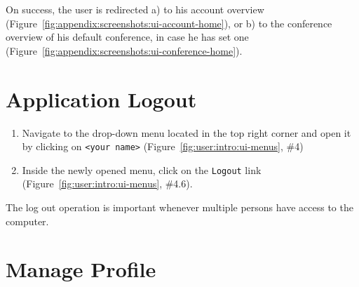 \documentclass[nochapterpage,nopartpage,noheadingspace,numbersubsubsec,bigchapter,colorback,accentcolor=tud9c,10pt]{tudreport}
\begin{document}
    \noindent
    On success, the user is redirected a) to his account overview (Figure~\ref{fig:appendix:screenshots:ui-account-home}), or b) to the conference overview of his default conference, in case he has set one (Figure~\ref{fig:appendix:screenshots:ui-conference-home}).

  \section{Application Logout}
  \label{ch:user:user:logout}

        \begin{enumerate}
            \setlength\itemsep{0em}
            \item Navigate to the drop-down menu located in the top right corner and open it by clicking on \texttt{<your name>} (Figure~\ref{fig:user:intro:ui-menus}, \#4)
            \item Inside the newly opened menu, click on the \texttt{Logout} link (Figure~\ref{fig:user:intro:ui-menus}, \#4.6).
        \end{enumerate}

    \noindent
    The log out operation is important whenever multiple persons have access to the computer.

  \section{Manage Profile}
  \label{ch:user:user:profile}
\end{document}

